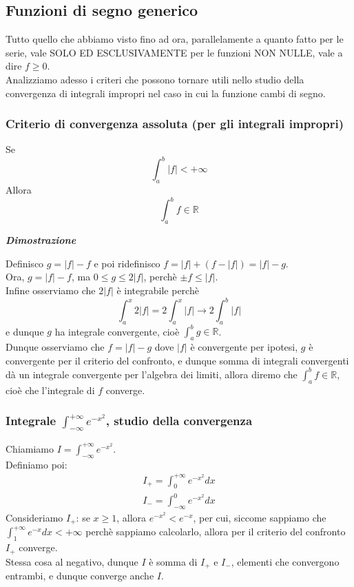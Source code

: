 \documentclass{article}
\theoremstyle{definition}
\newcommand{\R}{\mathbb{R}}
\begin{document}
\subsection{Funzioni di segno generico}
Tutto quello che abbiamo visto fino ad ora, parallelamente a quanto fatto per le serie, vale SOLO ED ESCLUSIVAMENTE per le funzioni NON NULLE, vale a dire $f \geqslant 0$.
\\
Analizziamo adesso i criteri che possono tornare utili nello studio della convergenza di integrali impropri nel caso in cui la funzione cambi di segno.
\\
\subsubsection{Criterio di convergenza assoluta (per gli integrali impropri)}
Se \begin{equation*}
    \int_a^b |f| < +\infty
\end{equation*}
Allora 
\begin{equation*}
    \int_a^b f \in \R
\end{equation*}
\begin{center}
    \textbf{\textit{Dimostrazione}}
\end{center}
Definisco $g=|f|-f$ e poi ridefinisco $ f=|f|+(f-|f|)=|f|-g$.
\\
Ora, $g= |f|-f$, ma $0 \leqslant g \leqslant 2|f|$, perchè $\pm f \leqslant |f|$.
\\
Infine osserviamo che $2|f|$ è integrabile perchè
\begin{equation*}
    \int_a^x 2 |f|=2\int_a^x |f| \to 2 \int_a^b |f|
\end{equation*}
e dunque $g$ ha integrale convergente, cioè $\int_a^b g \in \R$.
\\
Dunque osserviamo che $f= |f|- g$ dove $|f|$ è convergente per ipotesi, $g$ è convergente per il criterio del confronto, e dunque somma di integrali convergenti dà un integrale convergente per l'algebra dei limiti, allora diremo che $\int_a^b f \in \R$, cioè che l'integrale di $f$ converge.
\\
\subsubsection{Integrale $\int_{-\infty}^{+\infty} e^{-x^2}$, studio della convergenza}
Chiamiamo $I=\int_{-\infty}^{+\infty} e^{-x^2}$.
\\
Definiamo poi:
\begin{align*}
    I_+=\int_0^{+\infty} e^{-x^2}dx \\
    I_-=\int_{-\infty}^0 e^{-x^2}dx
\end{align*}
Consideriamo $I_+$: se $x \geqslant 1$, allora $e^{-x^2} < e^{-x}$, per cui, siccome sappiamo che $\int_1^{+\infty}e^{-x}dx < +\infty$ perchè sappiamo calcolarlo, allora per il criterio del confronto $I_+$ converge.
\\
Stessa cosa al negativo, dunque $I$ è somma di $I_+$ e $I_-$, elementi che convergono entrambi, e dunque converge anche $I$.
\end{document}
